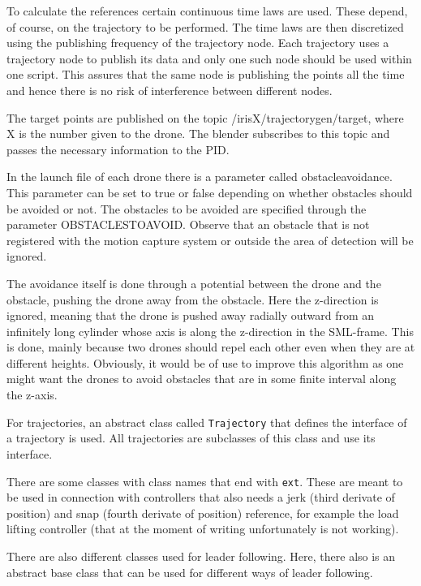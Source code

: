 \documentclass[titlepage,11pt,a4paper]{article}
\begin{document}
To calculate the references certain continuous time laws are
used. These depend, of course, on the trajectory to be performed. The
time laws are then discretized using the publishing frequency of the
trajectory node. Each trajectory uses a trajectory node to publish its
data and only one such node should be used within one script. This
assures that the same node is publishing the points all the time and
hence there is no risk of interference between different nodes.

The target points are published on the topic
/irisX/trajectory\textunderscore gen/target, where X is the number
given to the drone. The blender subscribes to this topic and passes
the necessary information to the PID.

In the launch file of each drone there is a parameter called
obstacle\textunderscore avoidance. This parameter can be set to true
or false depending on whether obstacles should be avoided or not. The
obstacles to be avoided are specified through the parameter
OBSTACLES\textunderscore TO\textunderscore AVOID. Observe that an
obstacle that is not registered with the motion capture system or
outside the area of detection will be ignored.

The avoidance itself is done through a potential between the drone and
the obstacle, pushing the drone away from the obstacle. Here the
z-direction is ignored, meaning that the drone is pushed away radially
outward from an infinitely long cylinder whose axis is along the
z-direction in the SML-frame.  This is done, mainly because two drones
should repel each other even when they are at different
heights. Obviously, it would be of use to improve this algorithm as
one might want the drones to avoid obstacles that are in some finite
interval along the z-axis.

For trajectories, an abstract class called \texttt{Trajectory} that
defines the interface of a trajectory is used. All trajectories are
subclasses of this class and use its interface.

There are some classes with class names that end with
\texttt{\textunderscore ext}. These are meant to be used in connection
with controllers that also needs a jerk (third derivate of position)
and snap (fourth derivate of position) reference, for example the load
lifting controller (that at the moment of writing unfortunately is not
working).

There are also different classes used for leader following. Here,
there also is an abstract base class that can be used for different
ways of leader following.
\end{document}
